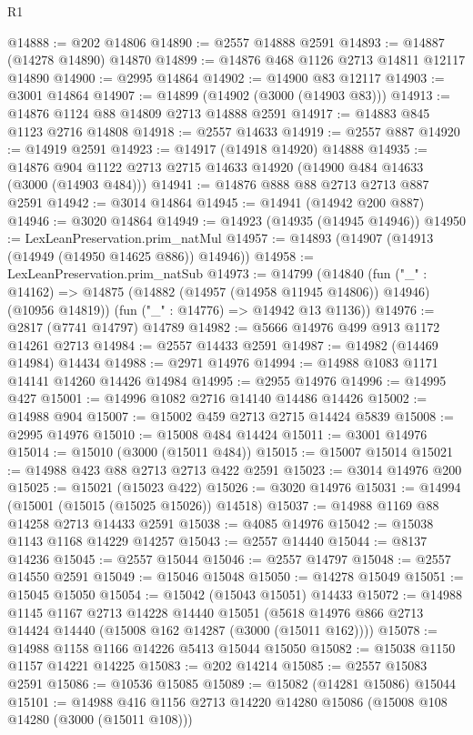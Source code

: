 \begin{lexlean}{R1}
\begin{coremodule}
@14888 := @202 @14806
@14890 := @2557 @14888 @2591
@14893 := @14887 (@14278 @14890) @14870
@14899 := @14876 @468 @1126 @2713 @14811 @12117 @14890
@14900 := @2995 @14864
@14902 := @14900 @83 @12117
@14903 := @3001 @14864
@14907 := @14899 (@14902 (@3000 (@14903 @83)))
@14913 := @14876 @1124 @88 @14809 @2713 @14888 @2591
@14917 := @14883 @845 @1123 @2716 @14808
@14918 := @2557 @14633
@14919 := @2557 @887
@14920 := @14919 @2591
@14923 := @14917 (@14918 @14920) @14888
@14935 := @14876 @904 @1122 @2713 @2715 @14633 @14920 (@14900 @484 @14633 (@3000 (@14903 @484)))
@14941 := @14876 @888 @88 @2713 @2713 @887 @2591
@14942 := @3014 @14864
@14945 := @14941 (@14942 @200 @887)
@14946 := @3020 @14864
@14949 := @14923 (@14935 (@14945 @14946))
@14950 := LexLeanPreservation.prim_natMul
@14957 := @14893 (@14907 (@14913 (@14949 (@14950 @14625 @886)) @14946))
@14958 := LexLeanPreservation.prim_natSub
@14973 := @14799
    (@14840
      (fun ("_" : @14162) => @14875 (@14882 (@14957 (@14958 @11945 @14806)) @14946) (@10956 @14819))
      (fun ("_" : @14776) => @14942 @13 @1136))
@14976 := @2817 (@7741 @14797) @14789
@14982 := @5666 @14976 @499 @913 @1172 @14261 @2713
@14984 := @2557 @14433 @2591
@14987 := @14982 (@14469 @14984) @14434
@14988 := @2971 @14976
@14994 := @14988 @1083 @1171 @14141 @14260 @14426 @14984
@14995 := @2955 @14976
@14996 := @14995 @427
@15001 := @14996 @1082 @2716 @14140 @14486 @14426
@15002 := @14988 @904
@15007 := @15002 @459 @2713 @2715 @14424 @5839
@15008 := @2995 @14976
@15010 := @15008 @484 @14424
@15011 := @3001 @14976
@15014 := @15010 (@3000 (@15011 @484))
@15015 := @15007 @15014
@15021 := @14988 @423 @88 @2713 @2713 @422 @2591
@15023 := @3014 @14976 @200
@15025 := @15021 (@15023 @422)
@15026 := @3020 @14976
@15031 := @14994 (@15001 (@15015 (@15025 @15026)) @14518)
@15037 := @14988 @1169 @88 @14258 @2713 @14433 @2591
@15038 := @4085 @14976
@15042 := @15038 @1143 @1168 @14229 @14257
@15043 := @2557 @14440
@15044 := @8137 @14236
@15045 := @2557 @15044
@15046 := @2557 @14797
@15048 := @2557 @14550 @2591
@15049 := @15046 @15048
@15050 := @14278 @15049
@15051 := @15045 @15050
@15054 := @15042 (@15043 @15051) @14433
@15072 := @14988
    @1145
    @1167
    @2713
    @14228
    @14440
    @15051
    (@5618 @14976 @866 @2713 @14424 @14440 (@15008 @162 @14287 (@3000 (@15011 @162))))
@15078 := @14988 @1158 @1166 @14226 @5413 @15044 @15050
@15082 := @15038 @1150 @1157 @14221 @14225
@15083 := @202 @14214
@15085 := @2557 @15083 @2591
@15086 := @10536 @15085
@15089 := @15082 (@14281 @15086) @15044
@15101 := @14988 @416 @1156 @2713 @14220 @14280 @15086 (@15008 @108 @14280 (@3000 (@15011 @108)))

\end{coremodule}
\end{lexlean}
